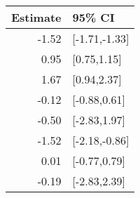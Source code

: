 \begin{tabular}{rl}
  \hline
Estimate & 95\% CI \\ 
  \hline
-1.52 & [-1.71,-1.33] \\ 
  0.95 & [0.75,1.15] \\ 
  1.67 & [0.94,2.37] \\ 
  -0.12 & [-0.88,0.61] \\ 
  -0.50 & [-2.83,1.97] \\ 
  -1.52 & [-2.18,-0.86] \\ 
  0.01 & [-0.77,0.79] \\ 
  -0.19 & [-2.83,2.39] \\ 
   \hline
\end{tabular}

